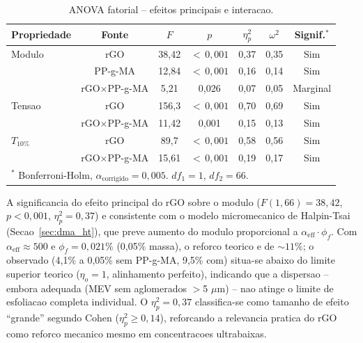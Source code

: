 \documentclass[11pt,a4paper,oneside]{article}
\begin{document}
\begin{table}[H]\centering
\caption{ANOVA fatorial -- efeitos principais e interacao.}\label{tab:anova}
\begin{tabular}{lcccccc}
\toprule
{\bfseries Propriedade} & {\bfseries Fonte} & {\bfseries $F$} & {\bfseries $p$} & {\bfseries $\eta^2_p$} & {\bfseries $\omega^2$} & {\bfseries Signif.$^*$} \\
\midrule
Modulo   & rGO            & 38,42 & ${<}\,0{,}001$ & 0,37 & 0,35 & Sim \\
         & PP-g-MA        & 12,84 & ${<}\,0{,}001$ & 0,16 & 0,14 & Sim \\
         & rGO$\times$PP-g-MA & 5,21 & 0,026 & 0,07 & 0,05 & Marginal \\
Tensao   & rGO            & 156,3 & ${<}\,0{,}001$ & 0,70 & 0,69 & Sim \\
         & rGO$\times$PP-g-MA & 11,42 & 0,001 & 0,15 & 0,13 & Sim \\
$T_{10\%}$ & rGO         & 89,7  & ${<}\,0{,}001$ & 0,58 & 0,56 & Sim \\
         & rGO$\times$PP-g-MA & 15,61 & ${<}\,0{,}001$ & 0,19 & 0,17 & Sim \\
\bottomrule
\multicolumn{7}{l}{\footnotesize $^*$ Bonferroni-Holm, $\alpha_{\text{corrigido}}{=}0{,}005$. $df_1{=}1$, $df_2{=}66$.}\\
\end{tabular}
\end{table}

A significancia do efeito principal do rGO sobre o modulo ($F(1{,}66){=}38{,}42$, $p{<}0{,}001$, $\eta^2_p{=}0{,}37$) e consistente com o modelo micromecanico de Halpin-Tsai (Secao~\ref{sec:dma_ht}), que preve aumento do modulo proporcional a $\alpha_{\text{eff}}{\cdot}\phi_f$. Com $\alpha_{\text{eff}}{\approx}500$ e $\phi_f{=}0{,}021\%$ (0,05\% massa), o reforco teorico e de ${\sim}11\%$; o observado (4,1\% a 0,05\% sem PP-g-MA, 9,5\% com) situa-se abaixo do limite superior teorico ($\eta_o{=}1$, alinhamento perfeito), indicando que a dispersao -- embora adequada (MEV sem aglomerados $>$5 $\mu$m) -- nao atinge o limite de esfoliacao completa individual. O $\eta^2_p{=}0{,}37$ classifica-se como tamanho de efeito ``grande'' segundo Cohen ($\eta^2_p{\ge}0{,}14$), reforcando a relevancia pratica do rGO como reforco mecanico mesmo em concentracoes ultrabaixas.
\end{document}
